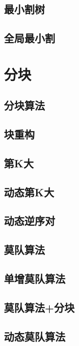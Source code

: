 \documentclass{article}
\begin{document}
\subsection{最小割树} 

\subsection{全局最小割} 



\newpage %
\section{分块} %
\subsection{分块算法} 

\subsection{块重构} 

\subsection{第K大} 

\subsection{动态第K大} 

\subsection{动态逆序对} 

\subsection{莫队算法} 

\subsection{单增莫队算法} 

\subsection{莫队算法+分块} 

\subsection{动态莫队算法} 

\end{document}

